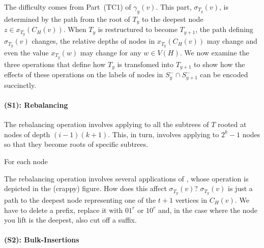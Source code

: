 \documentclass[kpfonts]{patmorin}
\begin{document}
The difficulty comes from Part~(TC1) of $\gamma_y(v)$.  This part, $\sigma_{T_y}(v)$, is determined by the path from the root of $T_y$ to the deepest node $z\in x_{T_y}(C_H(v))$.  When $T_y$ is restructured to become $T_{y+1}$, the path defining $\sigma_{T_y}(v)$ changes, the relative depths of nodes in $x_{T_y}(C_H(v))$ may change and even the value $x_{T_y}(w)$ may change for any $w\in V(H)$.  We now examine the three operations that define how $T_y$ is transfomed into $T_{y+1}$ to show how the effects of these operations on the labels of nodes in $S^-_y\cap S^-_{y+1}$ can be encoded succinctly.
% 
% 

\paragraph{(S1): Rebalancing}

The rebalancing operation involves applying  to all the subtrees of $T$ rooted at nodes of depth $(i-1)(k+1)$.  This, in turn, involves applying  to $2^k-1$ nodes so that they become roots of specific subtrees.



For each node 


The rebalancing operation involves several applications of , whose operation is depicted in the (crappy) figure. How does this affect $\sigma_{T_y}(v)$?  $\sigma_{T_y}(v)$ is just a path to the deepest node representing one of the $t+1$ vertices in $C_H(v)$.  We have to delete a prefix, replace it with $01^r$ or $10^r$ and, in the case where the node you lift is the deepest, also cut off a suffix.





\paragraph{(S2): Bulk-Insertions}
\end{document}
